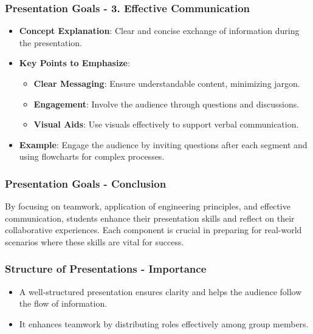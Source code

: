 \documentclass{beamer}
\begin{document}
\begin{frame}[fragile]
    \frametitle{Presentation Goals - 3. Effective Communication}
    \begin{itemize}
        \item \textbf{Concept Explanation}: Clear and concise exchange of information during the presentation.
        
        \item \textbf{Key Points to Emphasize}:
        \begin{itemize}
            \item \textbf{Clear Messaging}: Ensure understandable content, minimizing jargon.
            \item \textbf{Engagement}: Involve the audience through questions and discussions.
            \item \textbf{Visual Aids}: Use visuals effectively to support verbal communication.
        \end{itemize}
        
        \item \textbf{Example}: Engage the audience by inviting questions after each segment and using flowcharts for complex processes.
    \end{itemize}
\end{frame}

\begin{frame}[fragile]
    \frametitle{Presentation Goals - Conclusion}
    By focusing on teamwork, application of engineering principles, and effective communication, students enhance their presentation skills and reflect on their collaborative experiences. Each component is crucial in preparing for real-world scenarios where these skills are vital for success.
\end{frame}

\begin{frame}[fragile]
    \frametitle{Structure of Presentations - Importance}
    \begin{itemize}
        \item A well-structured presentation ensures clarity and helps the audience follow the flow of information.
        \item It enhances teamwork by distributing roles effectively among group members.
    \end{itemize}
\end{frame}
\end{document}
